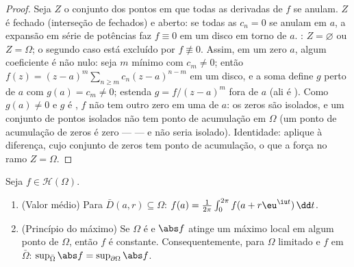 \begin{proof}
Seja $Z$ o conjunto dos pontos em que todas as derivadas de $f$
se anulam. $Z$ é fechado (interseção de fechados) e aberto: se todas
as $c_n = 0$ se anulam em $a$, a expansão em série de potências faz
$f
\equiv 0$ em um disco em torno de $a$. : $Z =
\varnothing$ ou $Z = \Omega$; o
segundo caso está excluído por $f
\not\equiv 0$. Assim, em um zero $a$, algum
coeficiente é não nulo: seja $m$ mínimo com $c_m \neq 0$; então $f(z) = (z -
a)^m\sum_{n\geq m}c_n(z-a)^{n-m}$ em um
disco, e a soma define $g$  perto de $a$ com $g(a) = c_m \neq 0$;
estenda $g = f/(z-a)^m$ fora de $a$ (ali é ). Como $g(a) \neq 0$ e $g$ é
, $f$ não tem outro zero em uma  de $a$: os
zeros são isolados, e um conjunto de pontos isolados não tem ponto de
acumulação em $\Omega$ (um ponto de acumulação de zeros é zero ---
 --- e não seria isolado). Identidade: aplique à diferença,
cujo conjunto de zeros tem ponto de acumulação, o que a força no ramo
$Z = \Omega$.
\end{proof}

\begin{theorem}
\label{thm:b3:holomorphic:maximum}
Seja $f \in \mathcal H(\Omega)$.
\begin{enumerate}
  \item (Valor médio) Para $\bar D(a, r) \subseteq \Omega$: $f(a) = \frac1{2\pi}\int_0^{2\pi}f(a +
        r\eu^{\iu t})\,\dd t$.
  \item (Princípio do máximo) Se $\Omega$ é  e $\abs f$
        atinge um máximo local em algum ponto de $\Omega$, então
        $f$ é constante. Consequentemente, para $\Omega$ limitado
        e $f$  em $\bar\Omega$: $\sup_{\bar\Omega}\abs f =
        \sup_{\partial\Omega}\abs f$.
\end{enumerate}
\end{theorem}

